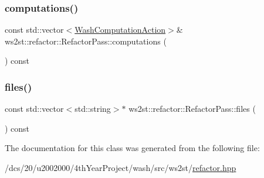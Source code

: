 \mbox{\label{classws2st_1_1refactor_1_1RefactorPass_aa92ed5b7adb785f3cfb42f41b1a003e4}} 
\subsubsection{\texorpdfstring{computations()}{computations()}}
{\footnotesize\ttfamily const std\+::vector$<$\mbox{\hyperlink{classws2st_1_1refactor_1_1WashComputationAction}{Wash\+Computation\+Action}}$>$\& ws2st\+::refactor\+::\+Refactor\+Pass\+::computations (\begin{DoxyParamCaption}{ }\end{DoxyParamCaption}) const\hspace{0.3cm}{\ttfamily [inline]}}

\mbox{\label{classws2st_1_1refactor_1_1RefactorPass_ac1c2e95b13d25ee91b5aa9c065296884}} 
\subsubsection{\texorpdfstring{files()}{files()}}
{\footnotesize\ttfamily const std\+::vector$<$std\+::string$>$$\ast$ ws2st\+::refactor\+::\+Refactor\+Pass\+::files (\begin{DoxyParamCaption}{ }\end{DoxyParamCaption}) const\hspace{0.3cm}{\ttfamily [inline]}}



The documentation for this class was generated from the following file\+:\begin{DoxyCompactItemize}
\item 
/dcs/20/u2002000/4th\+Year\+Project/wash/src/ws2st/\mbox{\hyperlink{refactor_8hpp}{refactor.\+hpp}}\end{DoxyCompactItemize}
